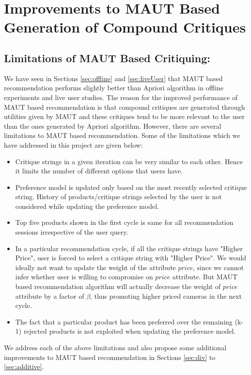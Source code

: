 \chapter{Improvements to MAUT Based Generation of Compound Critiques}
\label{chap:modifications}
\section{Limitations of MAUT Based Critiquing:}
\label{sec:limitations}

We have seen in Sections \ref{sec:offline} and \ref{sec:liveUser} that MAUT based recommendation performs slightly better than Apriori algorithm in offline experiments and live user studies.
The reason for the improved performance of MAUT based recommendation is that compound critiques are generated through utilities given by MAUT and these critiques tend to be more relevant to the user than the ones generated by Apriori algorithm.
However, there are several limitations to MAUT based recommendation. Some of the limitations which we have addressed in this project are given below:
\begin{itemize}
\setlength{\itemsep}{5pt}
\item Critique strings in a given iteration can be very similar to each other. Hence it limits the number of different options that users have.
\item Preference model is updated only based on the most recently selected critique string. History of products/critique strings selected by the user is not considered while updating the preference model.
\item Top five products shown in the first cycle is same for all recommendation sessions irrespective of the user query.
\item In a particular recommendation cycle, if all the critique strings have "Higher Price", user is forced to select a critique string with "Higher Price". We would ideally not want to update the weight of the attribute $price$, since we cannot infer whether user is willing to compromise on $price$ attribute. But MAUT based recommendation algorithm will actually decrease the weight of $price$ attribute by a factor of $\beta$, thus promoting higher priced cameras in the next cycle.
\item The fact that a particular product has been preferred over the remaining (k-1) rejected products is not exploited when updating the preference model.

\end{itemize}
We address each of the above limitations and also propose some additional improvements to MAUT based recommendation in Sections \ref{sec:div} to \ref{sec:additive}.













